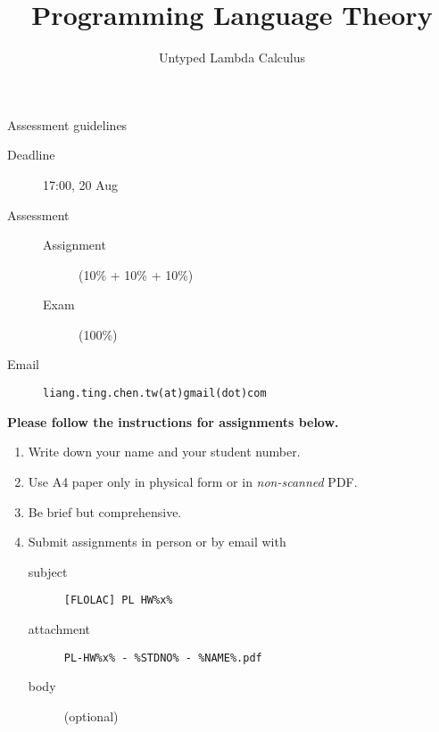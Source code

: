 \title{Programming Language Theory}
\subtitle{Untyped Lambda Calculus}

\begin{frame}
\maketitle
\end{frame}

\begin{frame}[fragile]{Assessment guidelines}
  \begin{description}
    \item[Deadline] 17:00, 20 Aug
    \item[Assessment] 
      \begin{description}
        \item[Assignment] (10\% + 10\% + 10\%)
        \item[Exam] (100\%)
      \end{description}
    \item[Email] \texttt{liang.ting.chen.tw(at)gmail(dot)com}
  \end{description}

  \textbf{Please follow the instructions for assignments below.}

  \begin{enumerate}
    \item Write down your name and your student number. 
    \item Use A4 paper only in physical form or in \emph{non-scanned} PDF. 
    \item Be brief but comprehensive.
    \item Submit assignments in person or by email with 
      \begin{description}
        \item[subject] \texttt{[FLOLAC] PL HW\%x\%}
        \item[attachment] \texttt{PL-HW\%x\% - \%STDNO\% - \%NAME\%.pdf}
        \item[body] (optional)
      \end{description}
  \end{enumerate}
\end{frame}

